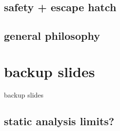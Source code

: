 \subsection{safety + escape hatch}




\subsection{general philosophy}


\section{backup slides}
\begin{frame}{backup slides}
\end{frame}

\subsection{static analysis limits?}




